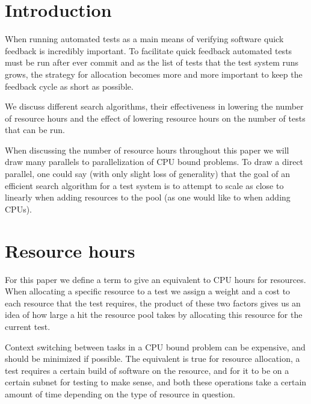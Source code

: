 \documentclass[twoside]{article}
\begin{document}
 \begin{multicols}{2}

\section{Introduction}

When running automated tests as a main means of verifying software quick
feedback is incredibly important. To facilitate quick feedback automated tests
must be run after ever commit and as the list of tests that the test system
runs grows, the strategy for allocation becomes more and more important to keep
the feedback cycle as short as possible.

We discuss different search algorithms, their effectiveness in lowering the
number of resource hours and the effect of lowering resource hours on the
number of tests that can be run.

When discussing the number of resource hours throughout this paper we will draw
many parallels to parallelization of CPU bound problems. To draw a direct
parallel, one could say (with only slight loss of generality) that the goal of
an efficient search algorithm for a test system is to attempt to scale as close
to linearly when adding resources to the pool (as one would like to when adding
CPUs).



\section{Resource hours}

For this paper we define a term to give an equivalent to CPU hours for
resources. When allocating a specific resource to a test we assign a weight and
a cost to each resource that the test requires, the product of these two
factors gives us an idea of how large a hit the resource pool takes by
allocating this resource for the current test.

Context switching between tasks in a CPU bound problem can be expensive, and
should be minimized if possible. The equivalent is true for resource
allocation, a test requires a certain build of software on the resource, and
for it to be on a certain subnet for testing to make sense, and both these
operations take a certain amount of time depending on the type of resource in
question.



\end{multicols}
\end{document}
